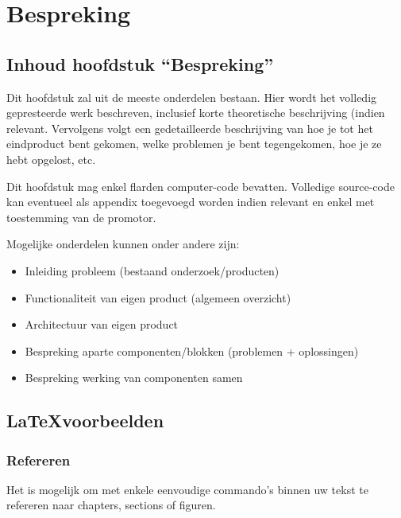\chapter[Bespreking]{Bespreking}
\label{chap_bespreking}

\section{Inhoud hoofdstuk ``Bespreking''}

Dit hoofdstuk zal uit de meeste onderdelen bestaan. Hier wordt het volledig gepresteerde werk beschreven, inclusief korte theoretische beschrijving (indien relevant. 
Vervolgens volgt een gedetailleerde beschrijving van hoe je tot het eindproduct bent gekomen, welke problemen je bent tegengekomen, hoe je ze hebt opgelost, etc.


Dit hoofdstuk mag enkel flarden computer-code bevatten. Volledige source-code kan eventueel als appendix toegevoegd worden indien relevant en enkel met toestemming van de promotor.

Mogelijke onderdelen kunnen onder andere zijn:
\begin{itemize}
  \item Inleiding probleem (bestaand onderzoek/producten) 
  \item Functionaliteit van eigen product (algemeen overzicht)
  \item Architectuur van eigen product
  \item Bespreking aparte componenten/blokken (problemen + oplossingen)
  \item Bespreking werking van componenten samen
\end{itemize}


\section{\LaTeX voorbeelden}

\subsection{Refereren}

Het is mogelijk om met enkele eenvoudige commando's binnen uw tekst te refereren naar chapters, sections of figuren. 

